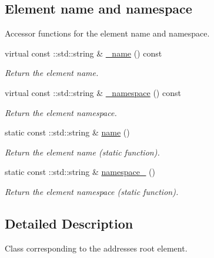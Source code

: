 \subsection*{Element name and namespace}
\label{_amgrpd4b5b61f6e07390f4af2465e04571f34}
Accessor functions for the element name and namespace. \begin{DoxyCompactItemize}
\item 
virtual const ::std::string \& \hyperlink{classopenstack_1_1xml_1_1Addresses___a303fdbe2b9609ab9cbc0906c73fc90be}{\_\-name} () const 
\begin{DoxyCompactList}\small\item\em Return the element name. \item\end{DoxyCompactList}\item 
virtual const ::std::string \& \hyperlink{classopenstack_1_1xml_1_1Addresses___a7d7c6c949bc6e3e4beba7f25d6eeee4d}{\_\-namespace} () const 
\begin{DoxyCompactList}\small\item\em Return the element namespace. \item\end{DoxyCompactList}\item 
static const ::std::string \& \hyperlink{classopenstack_1_1xml_1_1Addresses___a32ee2fbef1c546a72e2df29bd5219ae1}{name} ()
\begin{DoxyCompactList}\small\item\em Return the element name (static function). \item\end{DoxyCompactList}\item 
static const ::std::string \& \hyperlink{classopenstack_1_1xml_1_1Addresses___a0d32acb2e25830fcfe386369a14d68fe}{namespace\_\-} ()
\begin{DoxyCompactList}\small\item\em Return the element namespace (static function). \item\end{DoxyCompactList}\end{DoxyCompactItemize}


\subsection{Detailed Description}
Class corresponding to the addresses root element. 


